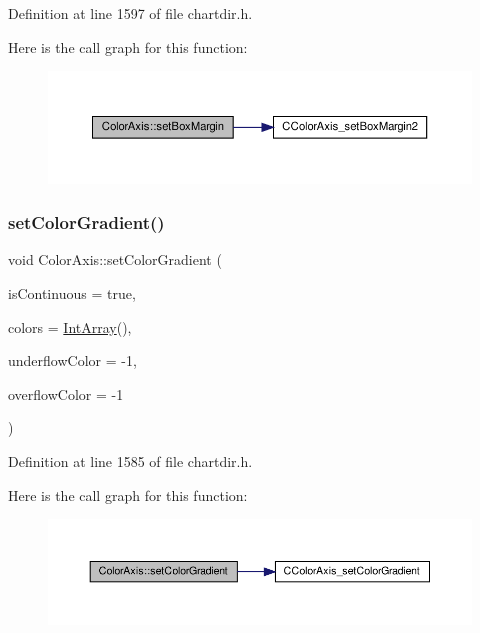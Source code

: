 Definition at line 1597 of file chartdir.\+h.

Here is the call graph for this function\+:
\nopagebreak
\begin{figure}[H]
\begin{center}
\leavevmode
\includegraphics[width=350pt]{class_color_axis_a803f0b7b216c5095767afd61dcb62141_cgraph}
\end{center}
\end{figure}
\mbox{\label{class_color_axis_ad714f882d231d7ab080f6f8cf100e9a9}} 
\subsubsection{\texorpdfstring{set\+Color\+Gradient()}{setColorGradient()}}
{\footnotesize\ttfamily void Color\+Axis\+::set\+Color\+Gradient (\begin{DoxyParamCaption}\item[{bool}]{is\+Continuous = {\ttfamily true},  }\item[{\hyperlink{class_int_array}{Int\+Array}}]{colors = {\ttfamily \hyperlink{class_int_array}{Int\+Array}()},  }\item[{int}]{underflow\+Color = {\ttfamily -\/1},  }\item[{int}]{overflow\+Color = {\ttfamily -\/1} }\end{DoxyParamCaption})\hspace{0.3cm}{\ttfamily [inline]}}



Definition at line 1585 of file chartdir.\+h.

Here is the call graph for this function\+:
\nopagebreak
\begin{figure}[H]
\begin{center}
\leavevmode
\includegraphics[width=350pt]{class_color_axis_ad714f882d231d7ab080f6f8cf100e9a9_cgraph}
\end{center}
\end{figure}
\mbox{\label{class_color_axis_a6b69eab76fa6cecf721ef1bcec32a817}} 
